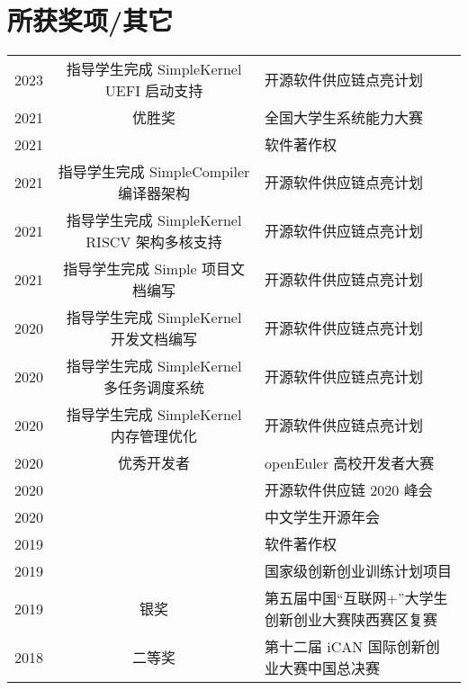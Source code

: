 \documentclass{resume}
\begin{document}
\section{所获奖项/其它} 
\begin{tabular}{rcl}
    2023         & 指导学生完成 SimpleKernel UEFI 启动支持 & 开源软件供应链点亮计划 \\
    2021         & 优胜奖 & 全国大学生系统能力大赛 \\ 
    2021         & & 软件著作权 \\
    2021         & 指导学生完成 SimpleCompiler 编译器架构 & 开源软件供应链点亮计划 \\
    2021         & 指导学生完成 SimpleKernel RISCV 架构多核支持 & 开源软件供应链点亮计划 \\
    2021         & 指导学生完成 Simple 项目文档编写 & 开源软件供应链点亮计划 \\
    2020         & 指导学生完成 SimpleKernel 开发文档编写 & 开源软件供应链点亮计划 \\
    2020         & 指导学生完成 SimpleKernel 多任务调度系统 & 开源软件供应链点亮计划 \\
    2020         & 指导学生完成 SimpleKernel 内存管理优化 & 开源软件供应链点亮计划 \\
    2020         & 优秀开发者 & openEuler 高校开发者大赛 \\ 
    2020         & & 开源软件供应链 2020 峰会 \\
    2020         & & 中文学生开源年会 \\
    2019         & & 软件著作权 \\
    2019         & & 国家级创新创业训练计划项目 \\
    2019         & 银奖    & 第五届中国“互联网+”大学生创新创业大赛陕西赛区复赛 \\
    2018	       & 二等奖  & 第十二届 iCAN 国际创新创业大赛中国总决赛 \\
\end{tabular}
\sectionsep
\end{document}
